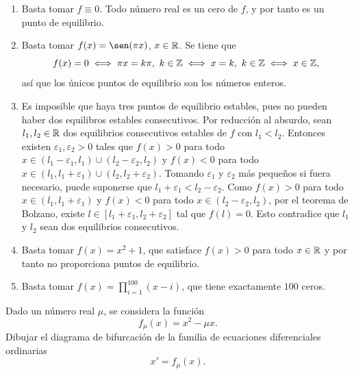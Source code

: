 \documentclass[11pt]{report}
\begin{document}
\begin{solution}
    \hfill
    \begin{enumerate}
        \item Basta tomar $f \equiv 0$. Todo número real es un cero de $f$, y por tanto es un punto de equilibrio.
        \item Basta tomar $f(x) = \sen(\pi x)$, $x \in \mathbb R$. Se tiene que
        \[f(x) = 0 \iff \pi x = k\pi, \ k \in \mathbb Z \iff x = k, \ k \in \mathbb Z \iff x \in \mathbb Z,\]
        así que los únicos puntos de equilibrio son los números enteros.
        \item Es imposible que haya tres puntos de equilibrio estables, pues no pueden haber dos equilibros estables consecutivos. Por reducción al absurdo, sean $l_1,l_2 \in \mathbb R$ dos equilibrios consecutivos estables de $f$ con $l_1<l_2$. Entonces existen $\varepsilon_1,\varepsilon_2>0$ tales que $f(x) > 0$ para todo $x \in (l_1-\varepsilon_1,l_1) \cup (l_2-\varepsilon_2,l_2)$ y $f(x) < 0$ para todo $x \in (l_1,l_1+\varepsilon_1) \cup (l_2,l_2+\varepsilon_2)$. Tomando $\varepsilon_1$ y $\varepsilon_2$ más pequeños si fuera necesario, puede suponerse que $l_1+\varepsilon_1<l_2-\varepsilon_2$.  Como $f(x) > 0$ para todo $x \in (l_1,l_1+\varepsilon_1)$ y $f(x) < 0$ para todo $x \in (l_2-\varepsilon_2,l_2)$, por el teorema de Bolzano, existe $l \in [l_1+\varepsilon_1,l_2+\varepsilon_2]$ tal que $f(l) = 0$. Esto contradice que $l_1$ y $l_2$ sean dos equilibrios consecutivos.
        \item Basta tomar $f(x) = x^2+1$, que satisface $f(x)>0$ para todo $x \in \mathbb R$ y por tanto no proporciona puntos de equilibrio.
        \item Basta tomar $f(x) = \prod_{i=1}^{100}(x-i)$, que tiene exactamente $100$ ceros.
    \end{enumerate}
\end{solution}

\begin{exercise}
    Dado un número real $\mu$, se considera la función
    \[f_\mu(x) = x^2-\mu x.\]
    Dibujar el diagrama de bifurcación de la familia de ecuaciones diferenciales ordinarias
    \[x'=f_\mu(x).\]
\end{exercise}
\end{document}
